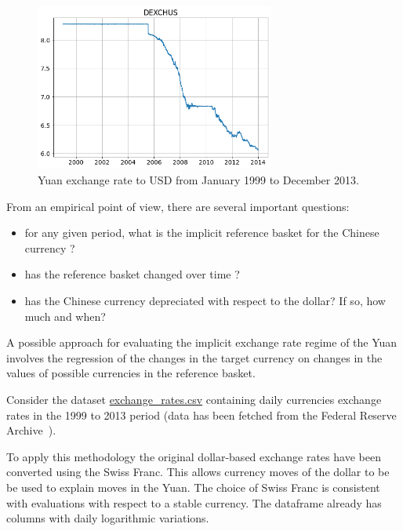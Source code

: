 \begin{figure}[htbp]
\centering
\includegraphics[width=0.7\textwidth]{figures/yuan_exchange_rate}
\caption{Yuan exchange rate to USD from January 1999 to December 2013.}
\label{fig:yuan_rate}
\end{figure}

From an empirical point of view, there are several important questions:
\begin{itemize}
\item for any given period, what is the implicit reference basket for the Chinese currency ?
\item has the reference basket changed over time ?
\item has the Chinese currency depreciated with respect to the dollar? If so, how much and when?
\end{itemize}

A possible approach for evaluating the implicit exchange rate regime of the Yuan involves the regression of the changes in the target currency on changes in the values of possible currencies in the reference basket.

Consider the dataset \href{https://raw.githubusercontent.com/matteosan1/finance_course/develop/libro/input_files/exchange_rates.csv}{exchange\_rates.csv} containing daily currencies exchange rates in the 1999 to 2013 period (data has been fetched from the Federal Reserve Archive~\cite{bib:fred}).

To apply this methodology the original dollar-based exchange rates have been converted using the Swiss Franc. This allows currency moves of the dollar to be be used to explain moves in the Yuan. The choice of Swiss Franc is consistent with evaluations with respect to a stable currency. The dataframe already has columns with daily logarithmic variations.


